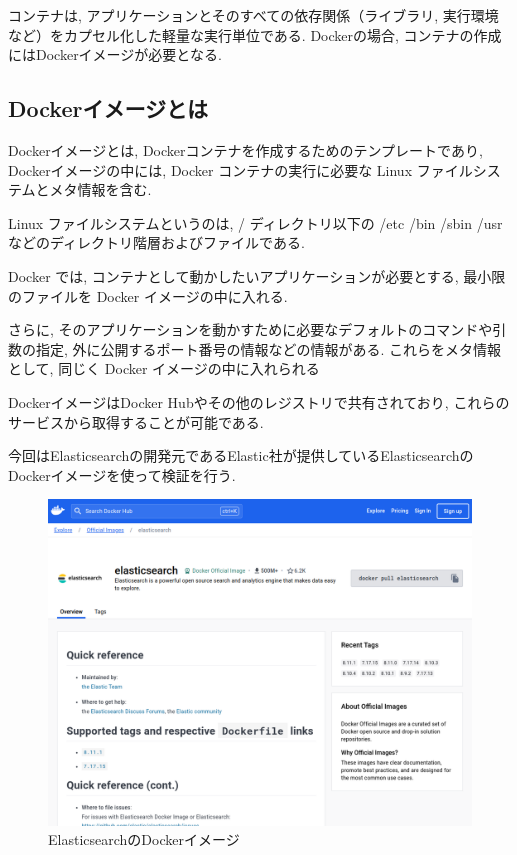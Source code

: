 コンテナは, アプリケーションとそのすべての依存関係（ライブラリ, 実行環境など）をカプセル化した軽量な実行単位である.
Dockerの場合, コンテナの作成にはDockerイメージが必要となる.

\subsection{Dockerイメージとは}

Dockerイメージとは, Dockerコンテナを作成するためのテンプレートであり, Dockerイメージの中には, Docker コンテナの実行に必要な Linux ファイルシステムとメタ情報を含む.

Linux ファイルシステムというのは,  / ディレクトリ以下の /etc /bin /sbin /usr などのディレクトリ階層およびファイルである. 

Docker では, コンテナとして動かしたいアプリケーションが必要とする, 最小限のファイルを Docker イメージの中に入れる. 

さらに, そのアプリケーションを動かすために必要なデフォルトのコマンドや引数の指定, 外に公開するポート番号の情報などの情報がある. これらをメタ情報として, 同じく Docker イメージの中に入れられる 

DockerイメージはDocker Hubやその他のレジストリで共有されており, これらのサービスから取得することが可能である.

今回はElasticsearchの開発元であるElastic社が提供しているElasticsearchのDockerイメージを使って検証を行う.

\begin{figure}[H]
  \begin{center}
    \includegraphics[width=120mm]{sotu/figure/elasticsearch-image.png}
    \caption{ElasticsearchのDockerイメージ}
    \label{4-p2}
  \end{center}
\end{figure}


